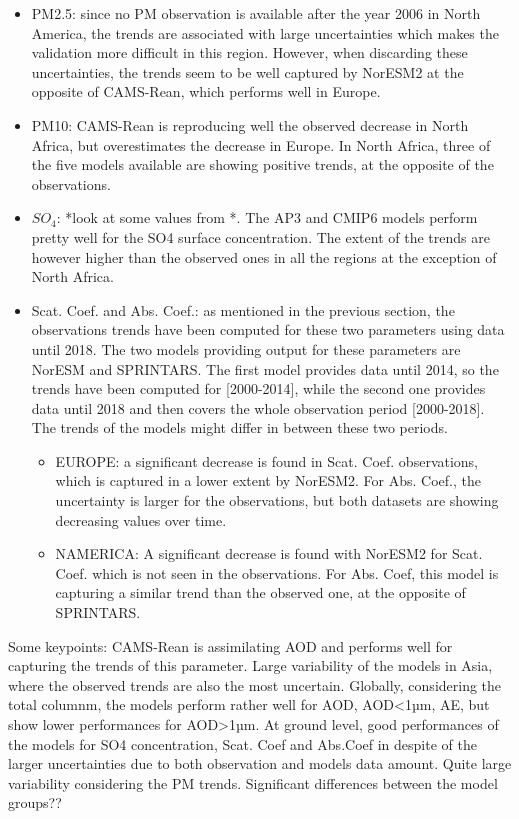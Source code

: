 \documentclass[journal abbreviation, manuscript]{copernicus}
\begin{document}
\begin{itemize}
 \item PM2.5: since no PM observation is available after the year 2006 in North America, the trends are associated with large uncertainties which makes the validation more difficult in this region. However, when discarding these uncertainties, the trends seem to be well captured by NorESM2 at the opposite of CAMS-Rean, which performs well in Europe.
 \item PM10: CAMS-Rean is reproducing well the observed decrease in North Africa, but overestimates the decrease in Europe. In North Africa, three of the five models available are showing positive trends, at the opposite of the observations.
 \item $SO_{4}$: *look at some values from \cite{aas2019global}*. The AP3 and CMIP6 models perform pretty well for the SO4 surface concentration. The extent of the trends are however higher than the observed ones in all the regions at the exception of North Africa.
 \item Scat. Coef. and Abs. Coef.: as mentioned in the previous section, the observations trends have been computed for these two parameters using data until 2018. The two models providing output for these parameters are NorESM and SPRINTARS. The first model provides data until 2014, so the trends have been computed for [2000-2014], while the second one provides data until 2018 and then covers the whole observation period [2000-2018]. The trends of the models might differ in between these two periods.
       \begin{itemize}
        \item EUROPE: a significant decrease is found in Scat. Coef. observations, which is captured in a lower extent by NorESM2. For Abs. Coef., the uncertainty is larger for the observations, but both datasets are showing decreasing values over time.
        \item NAMERICA: A significant decrease is found with NorESM2 for Scat. Coef. which is not seen in the observations. For Abs. Coef, this model is capturing a similar trend than the observed one, at the opposite of SPRINTARS.
       \end{itemize}
\end{itemize}

Some keypoints:
CAMS-Rean is assimilating AOD and performs well for capturing the trends of this parameter.
Large variability of the models in Asia, where the observed trends are also the most uncertain.
Globally, considering the total columnm, the models perform rather well for AOD, AOD<1µm, AE, but show lower performances for AOD>1µm. At ground level, good performances of the models for SO4 concentration, Scat. Coef and Abs.Coef in despite of the larger uncertainties due to both observation and models data amount. Quite large variability considering the PM trends. 
Significant differences between the model groups??
\end{document}
